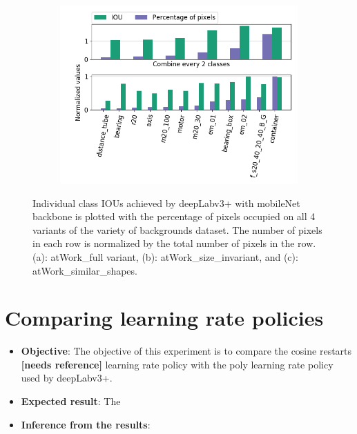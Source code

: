 \begin{figure}[!htb]
\begin{subfigure}{.5\textwidth}
				\includegraphics[width=1\linewidth]{images/cls_iou_shape}
				\label{Fig:clsiouc}
				\caption{}
			\end{subfigure}
			\caption{Individual class IOUs achieved by deepLabv3+ with mobileNet backbone is plotted with the percentage of pixels occupied on all 4 variants of the variety of backgrounds dataset. The number of pixels in each row is normalized by the total number of pixels in the row. (a): atWork\_full variant, (b): atWork\_size\_invariant, and (c): atWork\_similar\_shapes.}
			\label{Fig:clsiou}
		\end{figure}

\section{Comparing learning rate policies}
	
	\begin{itemize}
		\item \textbf{Objective}: The objective of this experiment is to compare the cosine restarts \textbf{[needs reference]} learning rate policy with the poly learning rate policy used by deepLabv3+.
		\item \textbf{Expected result}: The 
		\item \textbf{Inference from the results}:
	\end{itemize}
	
